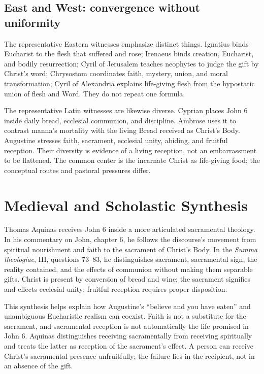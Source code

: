 \begin{deepstudy}
\subsection{East and West: convergence without uniformity}

The representative Eastern witnesses emphasize distinct things. Ignatius
binds Eucharist to the flesh that suffered and rose; Irenaeus binds creation,
Eucharist, and bodily resurrection; Cyril of Jerusalem teaches neophytes to
judge the gift by Christ's word; Chrysostom coordinates faith, mystery, union,
and moral transformation; Cyril of Alexandria explains life-giving flesh from
the hypostatic union of flesh and Word. They do not repeat one formula.

The representative Latin witnesses are likewise diverse. Cyprian places John
6 inside daily bread, ecclesial communion, and discipline. Ambrose uses it to
contrast manna's mortality with the living Bread received as Christ's Body.
Augustine stresses faith, sacrament, ecclesial unity, abiding, and fruitful
reception. Their diversity is evidence of a living reception, not an
embarrassment to be flattened. The common center is the incarnate Christ as
life-giving food; the conceptual routes and pastoral pressures differ.

\section{Medieval and Scholastic Synthesis}

Thomas Aquinas receives John 6 inside a more articulated sacramental theology.
In his commentary on John, chapter 6, he follows the discourse's movement from
spiritual nourishment and faith to the sacrament of Christ's Body. In the
\emph{Summa theologiae}, III, questions 73--83, he distinguishes sacrament,
sacramental sign, the reality contained, and the effects of communion without
making them separable gifts. Christ is present by conversion of bread and wine;
the sacrament signifies and effects ecclesial unity; fruitful reception
requires proper disposition.

This synthesis helps explain how Augustine's ``believe and you have eaten'' and
unambiguous Eucharistic realism can coexist. Faith is not a substitute for the
sacrament, and sacramental reception is not automatically the life promised in
John 6. Aquinas distinguishes receiving sacramentally from receiving
spiritually and treats the latter as reception of the sacrament's effect. A
person can receive Christ's sacramental presence unfruitfully; the failure lies
in the recipient, not in an absence of the gift.


\end{deepstudy}
